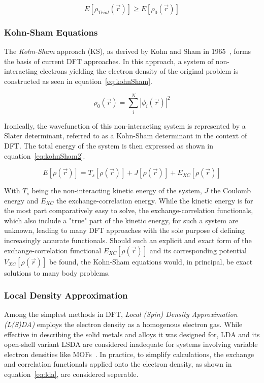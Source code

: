 \documentclass[12pt]{article}
\begin{document}
\begin{equation}
  E[\rho_{Trial}(\vec{r})] \geq E[\rho_{0}(\vec{r})]
  \label{eq:hohenbergKohn}
\end{equation}



\subsubsection{Kohn-Sham Equations}\label{kohnSham}

The \textit{Kohn-Sham} approach (KS), as derived by Kohn and Sham in 1965~\cite{Kohn1965}, forms the basis of current DFT approaches. 
In this approach, a system of non-interacting electrons yielding the electron density of the original problem is constructed as seen in equation~\ref{eq:kohnSham}.

\begin{equation}
  \rho_0(\vec{r}) = \sum_{i}^{N}|\phi_i(\vec{r})|^2
  \label{eq:kohnSham}
\end{equation}

\bigskip

\noindent Ironically, the wavefunction of this non-interacting system is represented by a Slater determinant, referred to as a Kohn-Sham determinant in the context of DFT.
The total energy of the system is then expressed as shown in equation~\ref{eq:kohnSham2}.

\begin{equation}
  E[\rho(\vec{r})] = T_s[\rho(\vec{r})] + J[\rho(\vec{r})] + E_{XC}[\rho(\vec{r})]
  \label{eq:kohnSham2}
\end{equation}

\bigskip

\noindent With $T_s$ being the non-interacting kinetic energy of the system, $J$ the Coulomb energy and $E_{XC}$ the exchange-correlation energy.
While the kinetic energy is for the most part comparatively easy to solve, the exchange-correlation functionals, which also include a "true" part of the kinetic energy, for such a system are unknown, leading to many DFT approaches with the sole purpose of defining increasingly accurate functionals.
Should such an explicit and exact form of the exchange-correlation functional $E_{XC}[\rho(\vec{r})]$ and its corresponding potential $V_{XC}[\rho(\vec{r})]$ be found, the Kohn-Sham equations would, in principal, be exact solutions to many body problems.

\subsubsection{Local Density Approximation}
Among the simplest methods in DFT, \textit{Local (Spin) Density Approximation (L(S)DA)} employs the electron density as a homogenous electron gas.
While effective in describing the solid metals and alloys it was designed for, LDA and its open-shell variant LSDA are considered inadequate for systems involving variable electron densities like MOFs~\cite{Perdew1981}.
In practice, to simplify calculations, the exchange and correlation functionals applied onto the electron density, as shown in equation~\ref{eq:lda}, are considered seperable.
\end{document}
